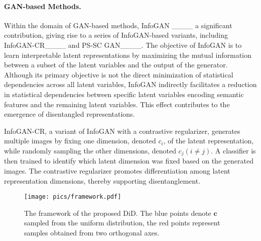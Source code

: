 \paragraph{GAN-based Methods.} Within the domain of GAN-based methods, InfoGAN ____ a significant contribution, giving rise to a series of InfoGAN-based variants, including InfoGAN-CR____ and PS-SC GAN____. The objective of InfoGAN is to learn interpretable latent representations by maximizing the mutual information between a subset of the latent variables and the output of the generator. Although its primary objective is not the direct minimization of statistical dependencies across all latent variables, InfoGAN indirectly facilitates a reduction in statistical dependencies between specific latent variables encoding semantic features and the remaining latent variables. This effect contributes to the emergence of disentangled representations. 

InfoGAN-CR, a variant of InfoGAN with a contrastive regularizer, generates multiple images by fixing one dimension, denoted $c_i$, of the latent representation, while randomly sampling the other dimensions, denoted $c_j(i \neq j)$. A classifier is then trained to identify which latent dimension was fixed based on the generated images. The contrastive regularizer promotes differentiation among latent representation dimensions, thereby supporting disentanglement.

\begin{figure*}[htbp] 
\centering 
\texttt{[image: pics/framework.pdf]} 
\caption{ The framework of the proposed DiD. The blue points denote $\mathbf{c}$ sampled from the uniform distribution, the red points represent samples obtained from two orthogonal axes.} 
\label{fig::model} 
\end{figure*}